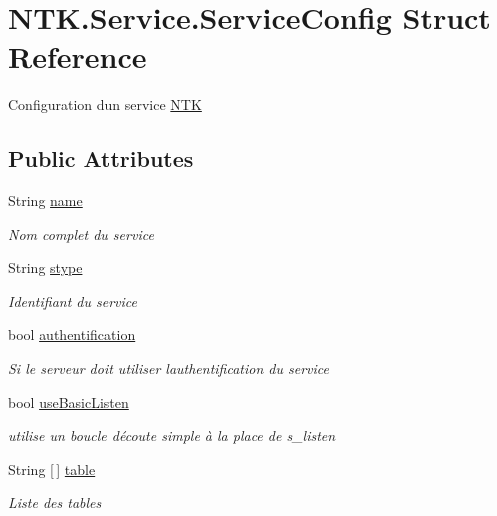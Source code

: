 \hypertarget{struct_n_t_k_1_1_service_1_1_service_config}{}\section{N\+T\+K.\+Service.\+Service\+Config Struct Reference}
\label{struct_n_t_k_1_1_service_1_1_service_config}


Configuration d\textquotesingle{}un service \mbox{\hyperlink{namespace_n_t_k}{N\+TK}}  


\subsection*{Public Attributes}
\begin{DoxyCompactItemize}
\item 
String \mbox{\hyperlink{struct_n_t_k_1_1_service_1_1_service_config_ace8244d129063d9818ed44eaf938eff4}{name}}
\begin{DoxyCompactList}\small\item\em Nom complet du service \end{DoxyCompactList}\item 
String \mbox{\hyperlink{struct_n_t_k_1_1_service_1_1_service_config_a8936231a6b511158cc54e56fff9c6947}{stype}}
\begin{DoxyCompactList}\small\item\em Identifiant du service \end{DoxyCompactList}\item 
bool \mbox{\hyperlink{struct_n_t_k_1_1_service_1_1_service_config_a4badab1fe4287d9dfdadf4f037bdd9e5}{authentification}}
\begin{DoxyCompactList}\small\item\em Si le serveur doit utiliser l\textquotesingle{}authentification du service \end{DoxyCompactList}\item 
bool \mbox{\hyperlink{struct_n_t_k_1_1_service_1_1_service_config_af7fcf5215443f09b659effe40bf8fa2c}{use\+Basic\+Listen}}
\begin{DoxyCompactList}\small\item\em utilise un boucle d\textquotesingle{}écoute simple à la place de s\+\_\+listen \end{DoxyCompactList}\item 
String \mbox{[}$\,$\mbox{]} \mbox{\hyperlink{struct_n_t_k_1_1_service_1_1_service_config_a5ea1dcacc1daca368e9f08d4924abaf9}{table}}
\begin{DoxyCompactList}\small\item\em Liste des tables \end{DoxyCompactList}\item 

\end{DoxyCompactItemize}
